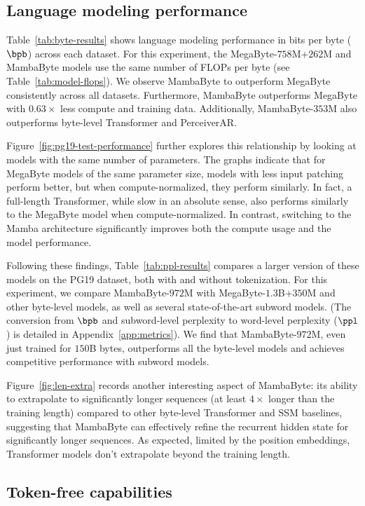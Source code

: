 \subsection{Language modeling performance} 
\label{sec:6.1}

Table~\ref{tab:byte-results} shows language modeling performance in bits per byte ($\bpb$) across each dataset. For this experiment, the MegaByte-$758$M+$262$M and MambaByte models use the same number of FLOPs per byte (see Table~\ref{tab:model-flops}). We observe MambaByte to outperform MegaByte consistently across all datasets. Furthermore, MambaByte outperforms MegaByte with $0.63\times$ less compute and training data. Additionally, MambaByte-$353$M also outperforms byte-level Transformer and PerceiverAR.

Figure~\ref{fig:pg19-test-performance} further explores this relationship by looking at models with the same number of parameters. The graphs indicate that for MegaByte models of the same parameter size, models with less input patching perform better, but when compute-normalized, they perform similarly. In fact, a full-length Transformer, while slow in an absolute sense, also performs similarly to the MegaByte model when compute-normalized. In contrast, switching to the Mamba architecture significantly improves both the compute usage and the model performance.

Following these findings, Table~\ref{tab:ppl-results} compares a larger version of these models on the PG19 dataset, both with and without tokenization. For this experiment, we compare MambaByte-$972$M with MegaByte-$1.3$B+$350$M and other byte-level models, as well as several state-of-the-art subword models. (The conversion from $\bpb$ and subword-level perplexity to word-level perplexity ($\ppl$) is detailed in Appendix~\ref{app:metrics}). We find that MambaByte-$972$M, even just trained for $150$B bytes, outperforms all the byte-level models and achieves competitive performance with subword models.

Figure~\ref{fig:len-extra} records another interesting aspect of MambaByte: its ability to extrapolate to significantly longer sequences (at least $4\times$ longer than the training length) compared to other byte-level Transformer and SSM baselines, suggesting that MambaByte can effectively refine the recurrent hidden state for significantly longer sequences. As expected, limited by the position embeddings, Transformer models don't extrapolate beyond the training length.

\subsection{Token-free capabilities}
\label{sec:6.2}


